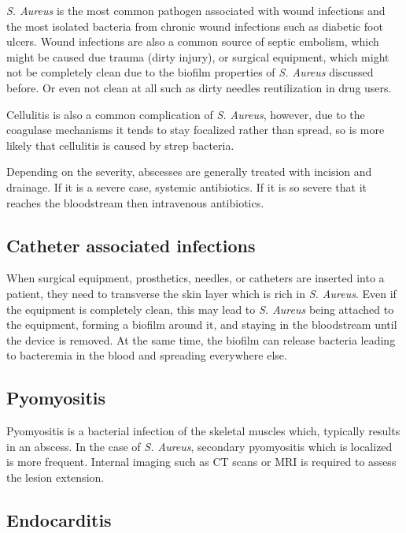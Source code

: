 \textit{S. Aureus} is the most common pathogen associated with wound infections and the most isolated bacteria from chronic wound infections \cite{Bhattacharya2015} such as diabetic foot ulcers. Wound infections are also a common source of septic embolism, which might be caused due trauma (dirty injury), or surgical equipment, which might not be completely clean due to the biofilm properties of \textit{S. Aureus} discussed before. Or even not clean at all such as dirty needles reutilization in drug users.

Cellulitis is also a common complication of \textit{S. Aureus}, however, due to the coagulase mechanisms it tends to stay focalized rather than spread, so is more likely that cellulitis is caused by strep bacteria. 

Depending on the severity, abscesses are generally treated with incision and drainage. If it is a severe case, systemic antibiotics. If it is so severe that it reaches the bloodstream then intravenous antibiotics.

\subsection{Catheter associated infections}

When surgical equipment, prosthetics, needles, or catheters are inserted into a patient, they need to transverse the skin layer which is rich in \textit{S. Aureus}. Even if the equipment is completely clean, this may lead to \textit{S. Aureus} being attached to the equipment, forming a biofilm around it, and staying in the bloodstream until the device is removed. At the same time, the biofilm can release bacteria leading to bacteremia in the blood and spreading everywhere else.

\subsection{Pyomyositis}

Pyomyositis is a bacterial infection of the skeletal muscles which, typically results in an abscess. In the case of \textit{S. Aureus}, secondary pyomyositis which is localized is more frequent. Internal imaging such as CT scans or MRI is required to assess the lesion extension.

\clearpage

\subsection{Endocarditis}

